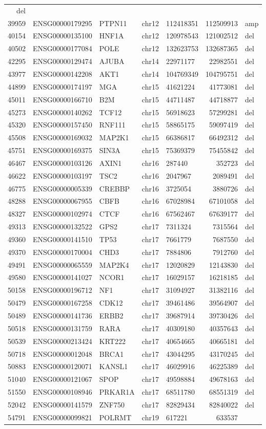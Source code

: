 \documentclass[]{article}
\begin{document}
\begin{longtable}[]{@{}rrlrlrl@{}}
del\tabularnewline
39959 & ENSG00000179295 & PTPN11 & chr12 & 112418351 & 112509913 &
amp\tabularnewline
40154 & ENSG00000135100 & HNF1A & chr12 & 120978543 & 121002512 &
del\tabularnewline
40502 & ENSG00000177084 & POLE & chr12 & 132623753 & 132687365 &
del\tabularnewline
42295 & ENSG00000129474 & AJUBA & chr14 & 22971177 & 22982551 &
del\tabularnewline
43977 & ENSG00000142208 & AKT1 & chr14 & 104769349 & 104795751 &
del\tabularnewline
44899 & ENSG00000174197 & MGA & chr15 & 41621224 & 41773081 &
del\tabularnewline
45011 & ENSG00000166710 & B2M & chr15 & 44711487 & 44718877 &
del\tabularnewline
45273 & ENSG00000140262 & TCF12 & chr15 & 56918623 & 57299281 &
del\tabularnewline
45320 & ENSG00000157450 & RNF111 & chr15 & 58865175 & 59097419 &
del\tabularnewline
45508 & ENSG00000169032 & MAP2K1 & chr15 & 66386817 & 66492312 &
del\tabularnewline
45751 & ENSG00000169375 & SIN3A & chr15 & 75369379 & 75455842 &
del\tabularnewline
46467 & ENSG00000103126 & AXIN1 & chr16 & 287440 & 352723 &
del\tabularnewline
46622 & ENSG00000103197 & TSC2 & chr16 & 2047967 & 2089491 &
del\tabularnewline
46775 & ENSG00000005339 & CREBBP & chr16 & 3725054 & 3880726 &
del\tabularnewline
48288 & ENSG00000067955 & CBFB & chr16 & 67028984 & 67101058 &
del\tabularnewline
48327 & ENSG00000102974 & CTCF & chr16 & 67562467 & 67639177 &
del\tabularnewline
49313 & ENSG00000132522 & GPS2 & chr17 & 7311324 & 7315564 &
del\tabularnewline
49360 & ENSG00000141510 & TP53 & chr17 & 7661779 & 7687550 &
del\tabularnewline
49370 & ENSG00000170004 & CHD3 & chr17 & 7884806 & 7912760 &
del\tabularnewline
49491 & ENSG00000065559 & MAP2K4 & chr17 & 12020829 & 12143830 &
del\tabularnewline
49580 & ENSG00000141027 & NCOR1 & chr17 & 16029157 & 16218185 &
del\tabularnewline
50158 & ENSG00000196712 & NF1 & chr17 & 31094927 & 31382116 &
del\tabularnewline
50479 & ENSG00000167258 & CDK12 & chr17 & 39461486 & 39564907 &
del\tabularnewline
50489 & ENSG00000141736 & ERBB2 & chr17 & 39687914 & 39730426 &
del\tabularnewline
50518 & ENSG00000131759 & RARA & chr17 & 40309180 & 40357643 &
del\tabularnewline
50539 & ENSG00000213424 & KRT222 & chr17 & 40654665 & 40665181 &
del\tabularnewline
50718 & ENSG00000012048 & BRCA1 & chr17 & 43044295 & 43170245 &
del\tabularnewline
50883 & ENSG00000120071 & KANSL1 & chr17 & 46029916 & 46225389 &
del\tabularnewline
51040 & ENSG00000121067 & SPOP & chr17 & 49598884 & 49678163 &
del\tabularnewline
51550 & ENSG00000108946 & PRKAR1A & chr17 & 68511780 & 68551319 &
del\tabularnewline
52042 & ENSG00000141579 & ZNF750 & chr17 & 82829434 & 82840022 &
del\tabularnewline
54791 & ENSG00000099821 & POLRMT & chr19 & 617221 & 633537 &

\end{longtable}
\end{document}
